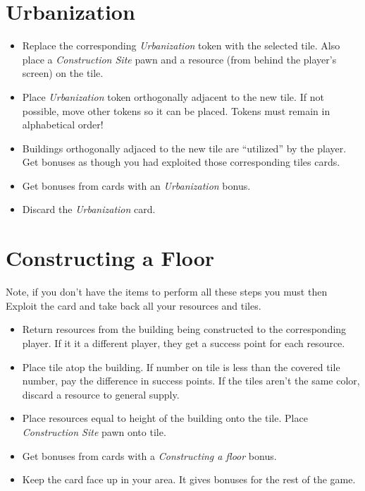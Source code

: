 \documentclass[10pt]{article}
\newenvironment{itemizeCustom}
{\begin{itemize}
  \setlength{\itemsep}{1pt}
  \setlength{\parskip}{0pt}
  \setlength{\parsep}{0pt}}
{\end{itemize}}
\begin{document}
\begin{multicols*}{2}
\section*{Urbanization}
\begin{itemizeCustom}
	\item Replace the corresponding \emph{Urbanization} token with the selected tile. Also place a \emph{Construction Site} pawn and a resource (from behind the player's screen) on the tile.
	\item Place \emph{Urbanization} token orthogonally adjacent to the new tile. If not possible, move other tokens so it can be placed. Tokens must remain in alphabetical order!
	\item Buildings orthogonally adjaced to the new tile are ``utilized'' by the player. Get bonuses as though you had exploited those corresponding tiles cards.
	\item Get bonuses from cards with an \emph{Urbanization} bonus.
	\item Discard the \emph{Urbanization} card.
\end{itemizeCustom}

\section*{Constructing a Floor}
Note, if you don't have the items to perform all these steps you must then Exploit the card and take back all your resources and tiles.
\begin{itemizeCustom}
	\item Return resources from the building being constructed to the corresponding player. If it it a different player, they get a success point for each resource.
	\item Place tile atop the building. If number on tile is less than the covered tile number, pay the difference in success points. If the tiles aren't the same color, discard a resource to general supply.
	\item Place resources equal to height of the building onto the tile. Place \emph{Construction Site} pawn onto tile.
	\item Get bonuses from cards with a \emph{Constructing a floor} bonus.
	\item Keep the card face up in your area. It gives bonuses for the rest of the game.
\end{itemizeCustom}


\end{multicols*}
\end{document}
